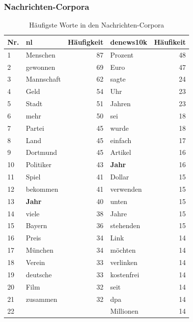 \documentclass[11pt, a4paper]{article}
\begin{document}
\subsubsection{Nachrichten-Corpora}

\begin{table}[ht]
    \begin{tabular}{l*{2}{lr}}
    \toprule
    Nr. & nl & Häufigkeit & denews10k & Häufikeit\\
    \midrule
    1  & Menschen    & 87 &  Prozent     & 48 \\
    2  & gewonnen    & 69 &  Euro        & 47 \\
    3  & Mannschaft  & 62 &  sagte       & 24 \\
    4  & Geld        & 54 &  Uhr         & 23 \\
    5  & Stadt       & 51 &  Jahren      & 23 \\
    6  & mehr        & 50 &  sei         & 18 \\
    7  & Partei      & 45 &  wurde       & 18 \\
    8  & Land        & 45 &  einfach     & 17 \\
    9  & Dortmund    & 45 &  Artikel     & 16 \\
    10 & Politiker   & 43 &  \textbf{Jahr}        & 16 \\
    11 & Spiel       & 41 &  Dollar      & 15 \\
    12 & bekommen    & 41 &  verwenden   & 15 \\
    13 & \textbf{Jahr}        & 40 &  unten       & 15 \\
    14 & viele       & 38 &  Jahre       & 15 \\
    15 & Bayern      & 36 &  stehenden   & 15 \\
    16 & Preis       & 34 &  Link        & 14 \\
    17 & München     & 34 &  möchten     & 14 \\
    18 & Verein      & 33 &  verlinken   & 14 \\
    19 & deutsche    & 33 &  kostenfrei  & 14 \\
    20 & Film        & 32 &  seit        & 14 \\
    21 & zusammen    & 32 &  dpa         & 14 \\
    22 &             &    &  Millionen   & 14 \\
    \bottomrule
    \end{tabular}
    \caption{Häufigste Worte in den Nachrichten-Corpora}
    \label{words-nachrichten}
\end{table}
\end{document}

